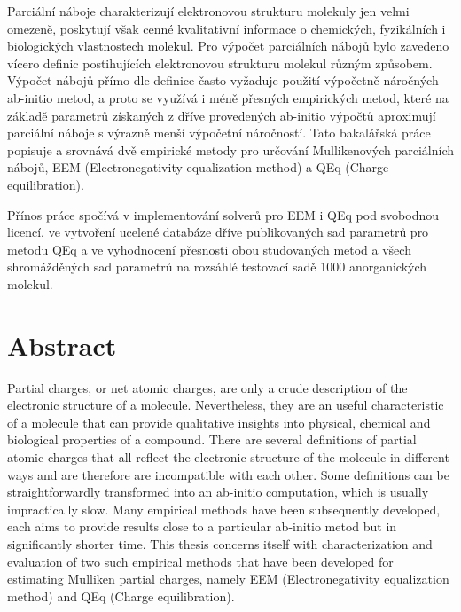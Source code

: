 \documentclass[10pt,draft,oneside]{fithesis2}
\begin{document}
\begin{ThesisAbstract}




Parciální náboje charakterizují elektronovou strukturu molekuly jen velmi omezeně, poskytují však cenné kvalitativní informace o chemických, fyzikálních i biologických vlastnostech molekul. Pro výpočet parciálních nábojů bylo zavedeno vícero definic postihujících elektronovou strukturu molekul různým způsobem. Výpočet nábojů přímo dle definice často vyžaduje použití výpočetně náročných ab-initio metod, a proto se využívá i méně přesných empirických metod, které na základě parametrů získaných z dříve provedených ab-initio výpočtů aproximují parciální náboje s výrazně menší výpočetní náročností. Tato bakalářská práce popisuje a srovnává dvě empirické metody pro určování Mullikenových parciálních nábojů, EEM (Electronegativity equalization method) a QEq (Charge equilibration).

Přínos práce spočívá v implementování solverů pro EEM i QEq pod svobodnou licencí, ve vytvoření ucelené databáze dříve publikovaných sad parametrů pro metodu QEq a ve vyhodnocení přesnosti obou studovaných metod a všech shromážděných sad parametrů na rozsáhlé testovací sadě 1000 anorganických molekul.

\begingroup
\let\clearpage\relax
{}
\chapter*{Abstract}
\endgroup

Partial charges, or net atomic charges, are only a crude description of the electronic structure of a molecule. Nevertheless, they are an useful characteristic of a molecule that can provide qualitative insights into physical, chemical and biological properties of a compound. There are several definitions of partial atomic charges that all reflect the electronic structure of the molecule in different ways and are therefore are incompatible with each other. Some definitions can be straightforwardly transformed into an ab-initio computation, which is usually impractically slow. Many empirical methods have been subsequently developed, each aims to provide results close to a particular ab-initio metod but in significantly shorter time. This thesis concerns itself with characterization and evaluation of two such empirical methods that have been developed for estimating Mulliken partial charges, namely EEM (Electronegativity equalization method) and QEq (Charge equilibration).


\end{ThesisAbstract}
\end{document}
